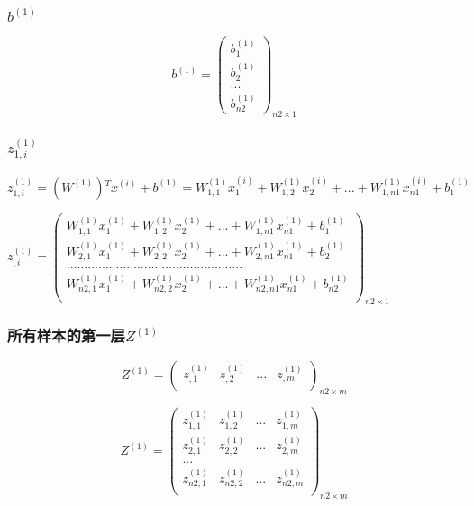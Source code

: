 \documentclass[
]{article}
\begin{document}
\hypertarget{header-n16}{%
\subsubsection{\texorpdfstring{\(b^{(1)}\)}{b\^{}\{(1)\}}}\label{header-n16}}

\[b^{(1)} = {\begin{pmatrix}
  b^{(1)}_{1} \\
  b^{(1)}_{2} \\
  ... \\
  b^{(1)}_{n2}
\end{pmatrix}}_{n2×1}\]

\hypertarget{header-n18}{%
\subsubsection{\texorpdfstring{\(z^{(1)}_{1,i}\)}{z\^{}\{(1)\}\_\{1,i\}}}\label{header-n18}}

\(z^{(1)}_{1,i} = (W^{(1)}){^T}x^{(i)}+b^{(1)}=W^{(1)}_{1,1}x^{(i)}_{1} + W^{(1)}_{1,2}x^{(i)}_{2} + ... + W^{(1)}_{1,n1}x^{(i)}_{n1}+b^{(1)}_{1}\)

\(z^{(1)}_{,i}
={\begin{pmatrix}
  W^{(1)}_{1,1}x^{(1)}_{1} + W^{(1)}_{1,2}x^{(1)}_{2} + ... + W^{(1)}_{1,n1}x^{(1)}_{n1}+b^{(1)}_{1} \\
  W^{(1)}_{2,1}x^{(1)}_{1} + W^{(1)}_{2,2}x^{(1)}_{2} + ... + W^{(1)}_{2,n1}x^{(1)}_{n1}+b^{(1)}_{2} \\
  ..................................................\\
  W^{(1)}_{n2,1}x^{(1)}_{1} + W^{(1)}_{n2,2}x^{(1)}_{2} + ... + W^{(1)}_{n2,n1}x^{(1)}_{n1}+b^{(1)}_{n2} \\
\end{pmatrix}}_{n2×1}\)

\hypertarget{header-n21}{%
\subsubsection{\texorpdfstring{所有样本的第一层\(Z^{(1)}\)}{所有样本的第一层Z\^{}\{(1)\}}}\label{header-n21}}

\[Z^{(1)}={\begin{pmatrix}
    z^{(1)}_{,1} & z^{(1)}_{,2} & ... & z^{(1)}_{,m} \\
  \end{pmatrix}}_{n2×m}\]

\[Z^{(1)}={\begin{pmatrix}
    z^{(1)}_{1,1} & z^{(1)}_{1,2} & ... & z^{(1)}_{1,m} \\
    z^{(1)}_{2,1} & z^{(1)}_{2,2} & ... & z^{(1)}_{2,m} \\
    ...\\
    z^{(1)}_{n2,1} & z^{(1)}_{n2,2} & ... & z^{(1)}_{n2,m} \\
  \end{pmatrix}}_{n2×m}\]
\end{document}

